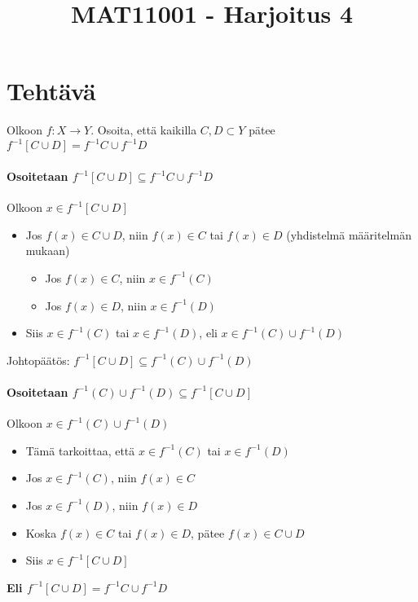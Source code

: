 \documentclass{article}
\newcounter{tehtava}
\begin{document}
    \thispagestyle{plain}
	\title{MAT11001 - Harjoitus 4}
	\date{}
	\maketitle
	
	
	\section*{Tehtävä \thetehtava}
    Olkoon $f : X \rightarrow Y$. Osoita, että kaikilla $C, D \subset Y$ pätee\newline
    $f^{-1} [C \cup D] = f^{-1}C \cup f^{-1}D$
    
    \paragraph*{Osoitetaan $f^{-1} [C \cup D] \subseteq f^{-1}C \cup f^{-1}D$}\quad\newline
    Olkoon $x \in f^{-1} [C \cup D]$\newline
    \begin{itemize}
        \item Jos $f(x) \in C \cup D$, niin $f(x) \in C$ tai $f(x) \in D$ (yhdistelmä määritelmän mukaan)
        \begin{itemize}
            \item Jos $f(x) \in C$, niin $x \in f^{-1}(C)$
            \item Jos $f(x) \in D$, niin $x \in f^{-1}(D)$  
        \end{itemize}
        \item Siis $x \in f^{-1}(C)$ tai $x \in f^{-1}(D)$, eli $x \in f^{-1}(C) \cup f^{-1}(D)$
    \end{itemize}
    Johtopäätös: $f^{-1} [C \cup D] \subseteq f^{-1}(C) \cup f^{-1}(D)$

    \paragraph*{Osoitetaan $f^{-1}(C) \cup f^{-1}(D) \subseteq f^{-1} [C \cup D] $}\quad\newline
    Olkoon $x \in f^{-1}(C) \cup f^{-1}(D)$
    \begin{itemize}
        \item Tämä tarkoittaa, että $x \in f^{-1}(C)$ tai $x \in f^{-1}(D)$
        \item Jos $x \in f^{-1}(C)$, niin $f(x) \in C$
        \item Jos $x \in f^{-1}(D)$, niin $f(x) \in D$
        \item Koska $f(x) \in C$ tai $f(x) \in D$, pätee $f(x) \in C \cup D$
        \item Siis $x \in f^{-1} [C \cup D]$
    \end{itemize}
    \textbf{Eli $f^{-1}[C \cup D] = f^{-1}C \cup f^{-1}D$}
\end{document}

